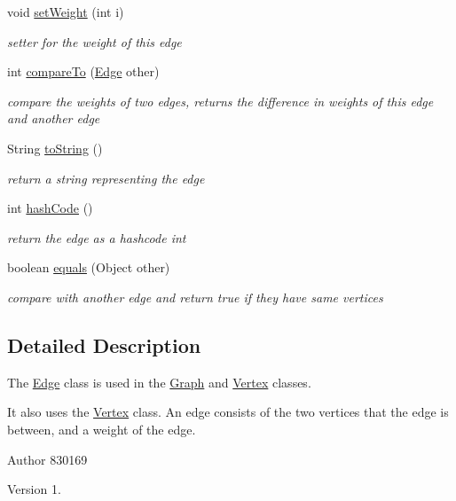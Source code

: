 \begin{DoxyCompactItemize}
void \hyperlink{class_edge_acfaab81fcf6ebc68aaa268bf1f14cdea}{set\+Weight} (int i)
\begin{DoxyCompactList}\small\item\em setter for the weight of this edge \end{DoxyCompactList}\item 
int \hyperlink{class_edge_a98faa9ff26104cffc051c241263b61c9}{compare\+To} (\hyperlink{class_edge}{Edge} other)
\begin{DoxyCompactList}\small\item\em compare the weights of two edges, returns the difference in weights of this edge and another edge \end{DoxyCompactList}\item 
String \hyperlink{class_edge_aff5a34ad7c7b523fb46af257e6a16a4b}{to\+String} ()
\begin{DoxyCompactList}\small\item\em return a string representing the edge \end{DoxyCompactList}\item 
int \hyperlink{class_edge_a3d641ff5fdd19b6ce360f591bd5bed54}{hash\+Code} ()
\begin{DoxyCompactList}\small\item\em return the edge as a hashcode int \end{DoxyCompactList}\item 
boolean \hyperlink{class_edge_a0c7e6548b7a43da81c0c0d6781d5ea07}{equals} (Object other)
\begin{DoxyCompactList}\small\item\em compare with another edge and return true if they have same vertices \end{DoxyCompactList}\end{DoxyCompactItemize}


\subsection{Detailed Description}
The \hyperlink{class_edge}{Edge} class is used in the \hyperlink{class_graph}{Graph} and \hyperlink{class_vertex}{Vertex} classes. 

It also uses the \hyperlink{class_vertex}{Vertex} class. An edge consists of the two vertices that the edge is between, and a weight of the edge.

\begin{DoxyAuthor}{Author}
830169 
\end{DoxyAuthor}
\begin{DoxyVersion}{Version}
1. 
\end{DoxyVersion}


